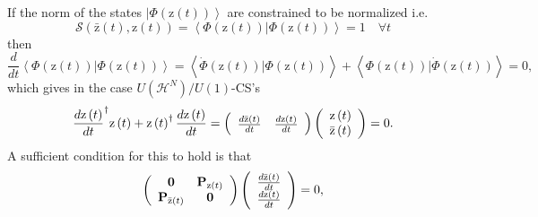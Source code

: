 \documentclass[aps,preprint]{revtex4}%
\begin{document}
If the norm of the states $\left\vert \Phi\left(  \mathrm{z}\left(  t\right)
\right)  \right\rangle $ are constrained to be normalized i.e.
\begin{equation}
\mathcal{S}\left(  \mathrm{\bar{z}}\left(  t\right)  ,\mathrm{z}\left(
t\right)  \right)  =\left\langle \Phi\left(  \mathrm{z}\left(  t\right)
\right)  \mathbf{|}\Phi\left(  \mathrm{z}\left(  t\right)  \right)
\right\rangle =1\quad\forall t
\end{equation}
then
\begin{equation}
\frac{d}{dt}\left\langle \Phi\left(  \mathrm{z}\left(  t\right)  \right)
\mathbf{|}\Phi\left(  \mathrm{z}\left(  t\right)  \right)  \right\rangle
=\left\langle \dot{\Phi}\left(  \mathrm{z}\left(  t\right)  \right)
\mathbf{|}\Phi\left(  \mathrm{z}\left(  t\right)  \right)  \right\rangle
+\left\langle \Phi\left(  \mathrm{z}\left(  t\right)  \right)  \mathbf{|}%
\dot{\Phi}\left(  \mathrm{z}\left(  t\right)  \right)  \right\rangle =0,
\end{equation}
which gives in the case $U\left(  \mathcal{H}^{N}\right)  /U\left(  1\right)
$-CS's
\begin{equation}
\frac{d\mathrm{z}\left(  t\right)  }{dt}^{\dag}\mathrm{z}\left(  t\right)
+\mathrm{z}\left(  t\right)  ^{\dagger}\frac{d\mathrm{z}\left(  t\right)
}{dt}=\left(
\begin{array}
[c]{cc}%
\frac{d\mathrm{\bar{z}}\left(  t\right)  }{dt} & \frac{d\mathrm{z}\left(
t\right)  }{dt}%
\end{array}
\right)  \left(
\begin{array}
[c]{c}%
\mathrm{z}\left(  t\right) \\
\mathrm{\bar{z}}\left(  t\right)
\end{array}
\right)  =0. \label{orthog1}%
\end{equation}
A sufficient condition for this to hold is that
\begin{equation}
\left(
\begin{array}
[c]{cc}%
\mathbf{0} & \mathbf{P}_{\mathrm{z}\left(  t\right)  }\\
\mathbf{P}_{\mathrm{\bar{z}}\left(  t\right)  } & \mathbf{0}%
\end{array}
\right)  \left(
\begin{array}
[c]{c}%
\frac{d\mathrm{\bar{z}}\left(  t\right)  }{dt}\\
\frac{d\mathrm{z}\left(  t\right)  }{dt}%
\end{array}
\right)  =0, \label{orthog2}%
\end{equation}
\end{document}
